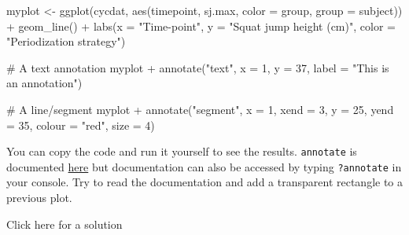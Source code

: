 \documentclass[
  11pt,
  letterpaper,
]{scrbook}
\newenvironment{Shaded}{\begin{snugshade}}{\end{snugshade}}
\newcommand{\AttributeTok}[1]{\textcolor[rgb]{0.40,0.45,0.13}{#1}}
\newcommand{\CommentTok}[1]{\textcolor[rgb]{0.37,0.37,0.37}{#1}}
\newcommand{\DecValTok}[1]{\textcolor[rgb]{0.68,0.00,0.00}{#1}}
\newcommand{\FunctionTok}[1]{\textcolor[rgb]{0.28,0.35,0.67}{#1}}
\newcommand{\NormalTok}[1]{\textcolor[rgb]{0.00,0.23,0.31}{#1}}
\newcommand{\OtherTok}[1]{\textcolor[rgb]{0.00,0.23,0.31}{#1}}
\newcommand{\SpecialCharTok}[1]{\textcolor[rgb]{0.37,0.37,0.37}{#1}}
\newcommand{\StringTok}[1]{\textcolor[rgb]{0.13,0.47,0.30}{#1}}
\begin{document}
\begin{Shaded}
\begin{Highlighting}[numbers=left,,]
\NormalTok{myplot }\OtherTok{\textless{}{-}} \FunctionTok{ggplot}\NormalTok{(cycdat, }\FunctionTok{aes}\NormalTok{(timepoint, sj.max, }\AttributeTok{color =}\NormalTok{ group, }\AttributeTok{group =}\NormalTok{ subject)) }\SpecialCharTok{+} 
  \FunctionTok{geom\_line}\NormalTok{() }\SpecialCharTok{+}
  \FunctionTok{labs}\NormalTok{(}\AttributeTok{x =} \StringTok{"Time{-}point"}\NormalTok{,}
       \AttributeTok{y =} \StringTok{"Squat jump height (cm)"}\NormalTok{, }
       \AttributeTok{color =} \StringTok{"Periodization strategy"}\NormalTok{) }


\CommentTok{\# A text annotation}
\NormalTok{myplot }\SpecialCharTok{+} \FunctionTok{annotate}\NormalTok{(}\StringTok{"text"}\NormalTok{, }\AttributeTok{x =} \DecValTok{1}\NormalTok{, }\AttributeTok{y =} \DecValTok{37}\NormalTok{, }\AttributeTok{label =} \StringTok{"This is an annotation"}\NormalTok{)}

\CommentTok{\# A line/segment }
\NormalTok{myplot }\SpecialCharTok{+} \FunctionTok{annotate}\NormalTok{(}\StringTok{"segment"}\NormalTok{, }\AttributeTok{x =} \DecValTok{1}\NormalTok{, }\AttributeTok{xend =} \DecValTok{3}\NormalTok{, }\AttributeTok{y =} \DecValTok{25}\NormalTok{, }\AttributeTok{yend =} \DecValTok{35}\NormalTok{,  }\AttributeTok{colour =} \StringTok{"red"}\NormalTok{, }\AttributeTok{size =} \DecValTok{4}\NormalTok{)}
\end{Highlighting}
\end{Shaded}

You can copy the code and run it yourself to see the results.
\texttt{annotate} is documented
\href{https://ggplot2.tidyverse.org/reference/annotate.html}{here} but
documentation can also be accessed by typing \texttt{?annotate} in your
console. Try to read the documentation and add a transparent rectangle
to a previous plot.

Click here for a solution
\end{document}
